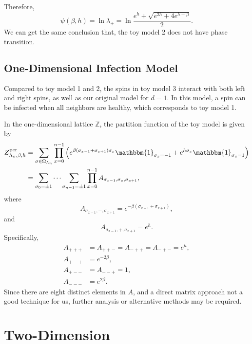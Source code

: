 \documentclass[11pt]{book}
\begin{document}
Therefore,
\begin{equation}\label{toy_model_3_pressure}
\psi(\beta,h) = \ln \lambda_+ = \ln \frac{e^h + \sqrt{e^{2h} + 4 e^{h - \beta}}}{2}.
\end{equation}
We can get the same conclusion that, the toy model 2 does not have phase transition.



\subsection{One-Dimensional Infection Model}
Compared to toy model 1 and 2, the spins in toy model 3 interact with both left and right spins, as well as our original model for $d=1$. In this model, a spin can be infected when all neighbors are healthy, which corresponds to toy model 1.

In the one-dimensional lattice $\mathbb{Z}$, the partition function of the toy model is given by
\begin{equation}\label{partition_function_odim}
\begin{aligned}
Z^{\text{per}}_{\Lambda_n,\beta,h}  
&= \sum_{\sigma \in \Omega_{\Lambda_n}} \prod_{x=0}^{n-1} \left( e^{\beta (\sigma_{x-1} + \sigma_{x+1}) \sigma_x} \mathbbm{1}_{\sigma_x = -1} + e^{h \sigma_x} \mathbbm{1}_{\sigma_x = 1} \right) \\
&= \sum_{\sigma_0=\pm 1} \cdots \sum_{\sigma_{n-1}=\pm 1} \prod_{x=0}^{n-1} A_{\sigma_{x-1},\sigma_x,\sigma_{x+1}},
\end{aligned}
\end{equation}
where
\[
A_{\sigma_{x-1},-,\sigma_{x+1}} = e^{-\beta (\sigma_{x-1} + \sigma_{x+1})},
\]
and
\[
A_{\sigma_{x-1},+,\sigma_{x+1}} = e^h.
\]
Specifically,
\begin{align*}
A_{+++} &= A_{++-} = A_{-++} = A_{-+-} = e^h, \\
A_{+-+} &= e^{-2\beta}, \\
A_{+--} &= A_{--+} = 1, \\
A_{---} &= e^{2\beta}.
\end{align*}
Since there are eight distinct elements in $A$, and a direct matrix approach not a good technique for us, further analysis or alternative methods may be required.



\section{Two-Dimension}
\end{document}
